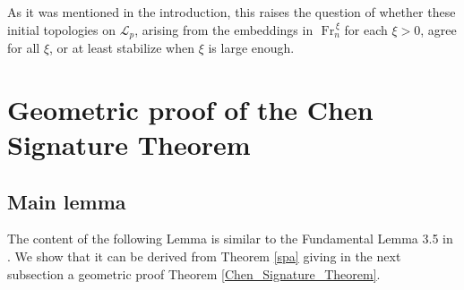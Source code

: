 \documentclass{amsart}
\newcommand{\R}{{\mathbb R}}
\newtheorem{definition}[theorem]{Definition}
\begin{document}


As it was mentioned in the introduction, this raises the question of whether these initial topologies on $\mathcal{L}_p$, arising from the embeddings in $\mbox{ Fr}_n^{\,\xi}$ for each $\xi>0$, agree for all $\xi$, or at least stabilize when $\xi$ is large enough. 



\section{Geometric proof of the Chen Signature Theorem}\label{geometric_proof}

\subsection{Main lemma}

The content of the following Lemma is similar to the Fundamental Lemma 3.5 in  \cite{Chen2}. We show that it can be derived from Theorem \ref{spa} giving in the next subsection a geometric proof Theorem \ref{Chen_Signature_Theorem}.
\end{document}
